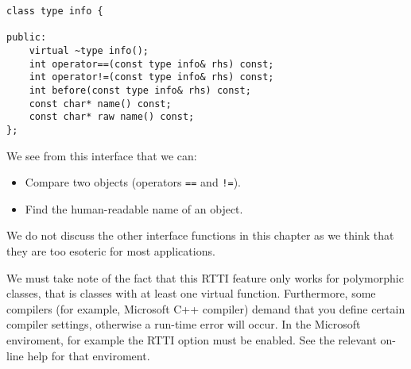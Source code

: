 \begin{lstlisting}
class type info {

public:
	virtual ~type info();
	int operator==(const type info& rhs) const;
	int operator!=(const type info& rhs) const;
	int before(const type info& rhs) const;
	const char* name() const;
	const char* raw name() const;
};
\end{lstlisting}
We see from this interface that we can:
\begin{itemize}
	\item Compare two objects (operators \texttt{==} and \texttt{!=}).
	\item Find the human-readable name of an object.
\end{itemize}
We do not discuss the other interface functions in this chapter as we think that they are too esoteric for most applications.

We must take note of the fact that this RTTI feature only works for polymorphic classes, that is classes with at least one virtual function. Furthermore, some compilers (for example, Microsoft C++ compiler) demand that you define certain compiler settings, otherwise a run-time error will occur. In the Microsoft enviroment, for example the RTTI option must be enabled. See the relevant on-line help for that enviroment.

